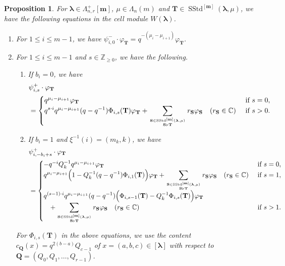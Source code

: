 \documentclass[12pt]{amsart}
\newtheorem{prop}[thm]{Proposition}
\numberwithin{equation}{thm}
\newcommand\CC{\mathbb C}
\newcommand\ZZ{\mathbb Z}
\newcommand\bQ{\mathbf Q}
\newcommand\bS{\mathbf S}
\newcommand\bT{\mathbf T}
\renewcommand\bm{\mathbf m} %
\newcommand\vf{\varphi}
\newcommand\vL{\varLambda}
\newcommand\Bla{\boldsymbol\lambda}
\newcommand{\dis}{\displaystyle}
\newcommand\trr{\triangleright }
\newcommand{\SStd}{\operatorname{SStd}}
\begin{document}
\begin{prop}
\label{psi vf bT}
For $\Bla \in \vL_{n,r}^+[\bm]$, $\mu \in \vL_n(m)$ and $\bT \in \SStd^{[\bm]} (\Bla,\mu)$, 
we have the following equations in the cell module $W(\Bla)$. 

\begin{enumerate}
\item 
For $1 \leq i \leq m-1$, we have 
$\psi_{i,0}^- \cdot \vf_{\bT} = q^{- (\mu_i - \mu_{i+1})} \vf_{\bT}$. 

\item 
For $1 \leq i \leq m-1$ and $s \in \ZZ_{\geq 0}$, we have the following. 
\begin{enumerate} 
\item 
If $b_i=0$, we have 
\begin{align*}
&\psi_{i,s}^+ \cdot \vf_{\bT} 
\\
&= \begin{cases}
		q^{\mu_i - \mu_{i+1}} \vf_{\bT} & \text{ if } s=0, 
		\\ \dis 
		q^{s \cdot i} q^{\mu_i - \mu_{i+1}}  (q-q^{-1}) \Phi_{i,s} (\bT) \vf_{\bT} 
			+ \sum_{\bS \in \SStd^{[\bm]}(\Bla, \mu) \atop \bS \trr \bT} r_{\bS} \vf_{\bS}
			\quad (r_{\bS} \in \CC) 
		& \text{ if } s >0. 
	\end{cases}
\end{align*}

\item 
If $b_i=1$ and $\xi^{-1} (i) = (m_k,k)$, we have 
\begin{align*}
& \psi_{i, -b_i +s}^+ \cdot \vf_{\bT} 
\\
&= \begin{cases}
	- q^{-i} Q_k^{-1} q^{\mu_i - \mu_{i+1}} \vf_{\bT} & \text{ if } s=0, 
	\\ \dis 
	q^{\mu_i - \mu_{i+1}} \Big( 1 - Q_k^{-1} (q-q^{-1}) \Phi_{i,1} (\bT) \Big) \vf_{\bT} 
		+ \sum_{\bS \in \SStd^{[\bm]}(\Bla, \mu) \atop \bS \trr \bT} r_{\bS} \vf_{\bS}
			\quad (r_{\bS} \in \CC)  
		& \text{ if } s=1, 
	\\ \dis 
	q^{(s-1) \cdot i} q^{\mu_i - \mu_{i+1}} (q-q^{-1}) \Big( \Phi_{i,s-1} (\bT) - Q_k^{-1} \Phi_{i, s} (\bT) \Big) \vf_{\bT} 
		\\\dis
		\quad 
		+ \sum_{\bS \in \SStd^{[\bm]}(\Bla, \mu) \atop \bS \trr \bT} r_{\bS} \vf_{\bS}
		\quad (r_{\bS} \in \CC)  
		& \text{ if } s >1.
\end{cases}
\end{align*}
\end{enumerate}
For $\Phi_{i,s} (\bT)$ in the above equations, 
we use the content $c_{\bQ}(x) = q^{2 (b-a)} Q_{c-1}$ of $x=(a,b,c) \in [\Bla]$ with respect to $\bQ=(Q_0,Q_1,\dots, Q_{r-1})$. 
\end{enumerate}
\end{prop}
\end{document}
